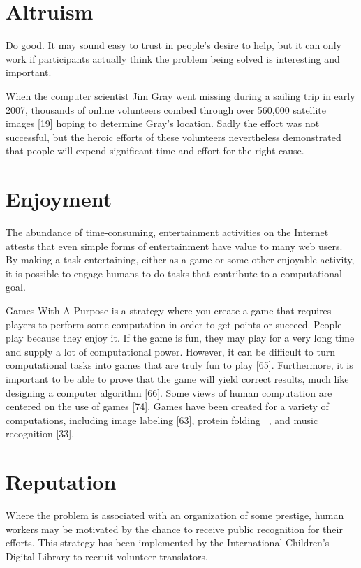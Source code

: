 \documentclass{acm_proc_article-sp}
\begin{document}
\section*{Altruism}
Do good. It may sound easy to trust in people's desire to help, but it can only work if participants actually think the problem being solved is interesting and important.

When the computer scientist Jim Gray went missing during a sailing trip in early 2007, thousands of online volunteers combed through over 560,000 satellite images [19] hoping to determine Gray's location. Sadly the effort was not successful, but the heroic efforts of these volunteers nevertheless demonstrated that people will expend significant time and effort for the right cause.
\section*{Enjoyment}
The abundance of time-consuming, entertainment activities on the Internet attests that even simple forms of entertainment have value to many web users. By making a task entertaining, either as a game or some other enjoyable activity, it is possible to engage humans to do tasks that contribute to a computational goal.

Games With A Purpose is a strategy where you create a game that requires players to perform some computation in order to get points or succeed. People play because they enjoy it. If the game is fun, they may play for a very long time and supply a lot of computational power. However, it can be difficult to turn computational tasks into games that are truly fun to play [65]. Furthermore, it is important to be able to prove that the game will yield correct results, much like designing a computer algorithm [66]. Some views of human computation are centered on the use of games [74]. Games have been created for a variety of computations, including image labeling [63], protein folding ~\cite{cooper2010pre}, and music recognition [33].
\section*{Reputation}
Where the problem is associated with an organization of some prestige, human workers may be motivated by the chance to receive public recognition for their efforts. This strategy has been implemented by the International Children's Digital Library to recruit volunteer translators.
\end{document}
